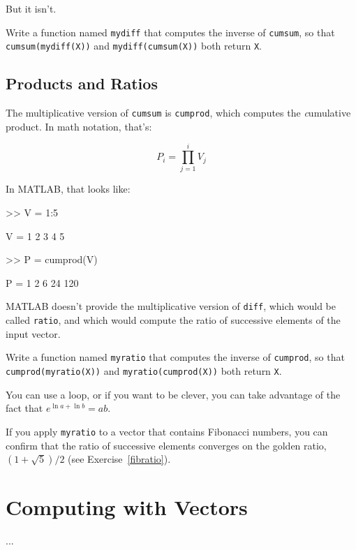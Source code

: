 But it isn't.

\begin{ex}
Write a function named {\tt mydiff} that computes the
inverse of {\tt cumsum}, so that {\tt cumsum(mydiff(X))} and
{\tt mydiff(cumsum(X))} both return {\tt X}.

\end{ex}


\subsection{Products and Ratios}

The multiplicative version of {\tt cumsum} is {\tt cumprod},
which computes the {\emph cumulative product}.  In math notation,
that's:


\begin{equation}
P_i = \prod_{j=1}^i V_j
\end{equation}

In MATLAB, that looks like:

\begin{code}
>> V = 1:5

V = 1     2     3     4     5

>> P = cumprod(V)

P = 1     2     6    24   120
\end{code}

MATLAB doesn't provide the multiplicative version
of {\tt diff}, which would be called {\tt ratio}, and which would
compute the ratio of successive elements of the input vector.

\begin{ex}
Write a function named {\tt myratio} that computes the
inverse of {\tt cumprod}, so that {\tt cumprod(myratio(X))} and
{\tt myratio(cumprod(X))} both
return {\tt X}.

You can use a loop, or if you want to be clever, you can take
advantage of the fact that $e^{\ln a + \ln b} = a b$.

If you apply {\tt myratio} to a vector that contains Fibonacci
numbers, you can confirm that the ratio of successive elements
converges on the golden ratio, $(1+\sqrt{5})/2$ (see
Exercise~\ref{fibratio}).

\end{ex}

\section{Computing with Vectors}
...
